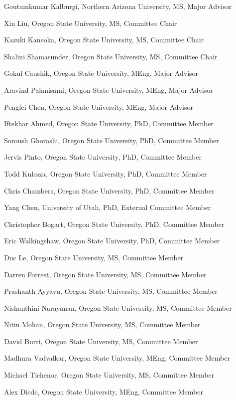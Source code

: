 \documentclass[ComputerScience]{vita}
\begin{document}
\begin{vita}
\begin{Other Graduated Students}
\item  Goutamkumar Kalburgi, Northern Arizona University, MS, Major Advisor
\item Xin Liu, Oregon State University, MS, Committee Chair 
\item Kazuki Kaneoka, Oregon State University, MS, Committee Chair 
\item Shalini Shamasunder, Oregon State University, MS, Committee Chair
\item Gokul Caushik, Oregon State University, MEng, Major Advisor
\item Aravind Palanisami, Oregon State University, MEng, Major Advisor
\item Pengfei Chen, Oregon State University, MEng, Major Advisor
\item Iftekhar Ahmed, Oregon State University, PhD, Committee Member
\item Soroush Ghorashi, Oregon State University, PhD, Committee Member
\item Jervis Pinto, Oregon State University, PhD, Committee Member
\item Todd Kulesza, Oregon State University, PhD, Committee Member
\item Chris Chambers, Oregon State University, PhD, Committee Member
\item Yang Chen, University of Utah, PhD, External Committee Member
\item Christopher Bogart, Oregon State University, PhD, Committee Member
\item Eric Walkingshaw, Oregon State University, PhD, Committee Member
\item Duc Le, Oregon State University, MS, Committee Member
\item Darren Forrest, Oregon State University, MS, Committee Member
\item Prashanth Ayyavu, Oregon State University, MS, Committee Member
\item Nishanthini Narayanan, Oregon State University, MS, Committee Member
\item Nitin Mohan, Oregon State University, MS, Committee Member
\item David Burri, Oregon State University, MS, Committee Member
\item Madhura Vadvalkar, Oregon State University, MEng, Committee Member
\item Michael Tichenor, Oregon State University, MS, Committee Member
\item Alex Diede, Oregon State University, MEng, Committee Member
\end{Other Graduated Students}




\end{vita}
\end{document}
